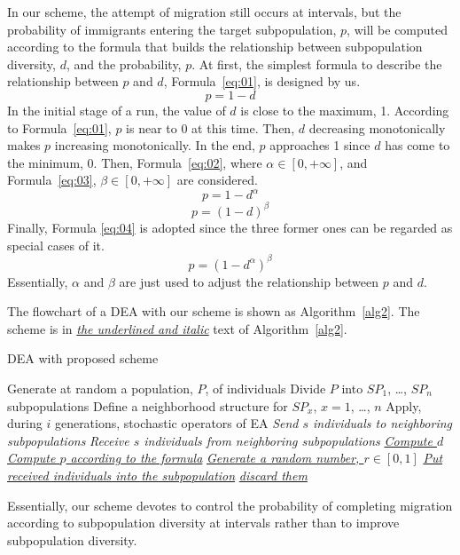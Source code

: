 \documentclass[journal,onecolumn]{IEEEtran}
\begin{document}
In our scheme, the attempt of migration still occurs at intervals, but the probability of immigrants entering the target subpopulation, $p$, will be computed according to the formula that builds the relationship between subpopulation diversity, $d$, and the probability, $p$.
At first, the simplest formula to describe the relationship between $p$ and $d$, Formula~\ref{eq:01}, is designed by us.
\begin{equation}
  p =1 - d
\label{eq:01}
\end{equation}
In the initial stage of a run, the value of $d$ is close to the maximum, 1.
According to Formula~\ref{eq:01}, $p$ is near to 0 at this time.
Then, $d$ decreasing monotonically makes $p$ increasing monotonically.
In the end, $p$ approaches 1 since $d$ has come to the minimum, 0.
Then, Formula~\ref{eq:02}, where $\alpha\in[0,+\infty]$, and Formula~\ref{eq:03}, $\beta\in[0,+\infty]$ are considered.
\begin{equation}
  p =1 - d^\alpha
\label{eq:02}
\end{equation}
\begin{equation}
  p =(1 - d)^\beta
\label{eq:03}
\end{equation}
Finally, Formula \ref{eq:04} is adopted since the three former ones can be regarded as special cases of it.
\begin{equation}
  p =(1 - d^\alpha)^\beta
\label{eq:04}
\end{equation}
Essentially, $\alpha$ and $\beta$ are just used to adjust the relationship between $p$ and $d$.

The flowchart of a DEA with our scheme is shown as Algorithm~\ref{alg2}.
The scheme is in \underline{\emph{the underlined and italic}} text of Algorithm~\ref{alg2}.
\begin{algorithm}
\caption{DEA with proposed scheme}
\label{alg2}
\begin{algorithmic}[1]
\STATE Generate at random a population, $P$, of individuals
\STATE Divide $P$ into $SP_1$, \ldots, $SP_n$ subpopulations
\STATE Define a neighborhood structure for $SP_x$, $x=1$, \ldots, $n$
\REPEAT [Execute in parallel the next steps for $SP_x$, $x=1$, \ldots, $n$]
 \STATE Apply, during $i$ generations, stochastic operators of EA
 \STATE \emph{Send $s$ individuals to neighboring subpopulations}
 \STATE \emph{Receive $s$ individuals from neighboring subpopulations}
 \STATE \underline{\emph{Compute $d$}}
 \STATE \underline{\emph{Compute $p$ according to the formula}}
 \STATE \underline{\emph{Generate a random number, $r \in [0,1]$}}
  \STATE \underline{\emph{Put received individuals into the subpopulation}}
 \ELSE
  \STATE \underline{\emph{discard them}}
 \ENDIF
{}
\end{algorithmic}
\end{algorithm}
Essentially, our scheme devotes to control the probability of completing migration according to subpopulation diversity at intervals rather than to improve subpopulation diversity.
\par
%
\end{document}
